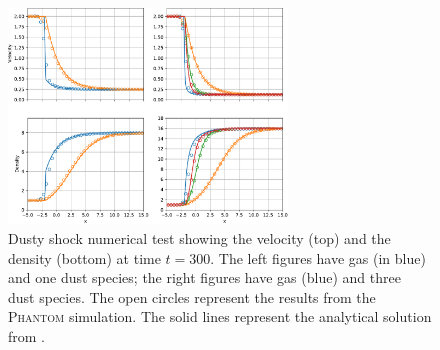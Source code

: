 \documentclass[fleqn,usenatbib]{mnras}
\begin{document}
\begin{figure}
   \begin{center}
      \includegraphics[width=0.66\textwidth]{figs/dustyshock_velocity_density.pdf}
      \caption{Dusty shock numerical test showing the velocity (top) and the
         density (bottom) at time \(t=300\). The left figures have gas (in blue)
         and one dust species; the right figures have gas (blue) and three dust
         species. The open circles represent the results from the
         \textsc{Phantom} simulation. The solid lines represent the analytical
         solution from \citet{Benitez-Llambay2019ApJS..241...25B}.%
         \label{fig:dustyshock_final}}
   \end{center}
\end{figure}
\end{document}
